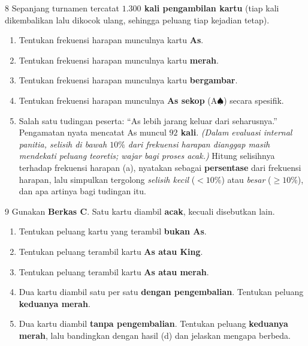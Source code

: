 \documentclass[11pt]{article}
\newenvironment{subsoal}{%
  \begin{enumerate}[label=\textbf{(\alph*)},leftmargin=1.8em,itemsep=5pt,topsep=3pt]}%
  {\end{enumerate}}
\begin{document}
\begin{soal}{8}
Sepanjang turnamen tercatat \textbf{$1.300$ kali pengambilan kartu} (tiap kali
dikembalikan lalu dikocok ulang, sehingga peluang tiap kejadian tetap).
\begin{subsoal}
  \item Tentukan frekuensi harapan munculnya kartu \textbf{As}.
  \item Tentukan frekuensi harapan munculnya kartu \textbf{merah}.
  \item Tentukan frekuensi harapan munculnya kartu \textbf{bergambar}.
  \item Tentukan frekuensi harapan munculnya \textbf{As sekop} ($\mathrm{A}\spadesuit$)
        secara spesifik.
  \item Salah satu tudingan peserta: ``As lebih jarang keluar dari seharusnya.''
        Pengamatan nyata mencatat As muncul \textbf{$92$ kali}. \emph{(Dalam evaluasi
        internal panitia, selisih di bawah $10\%$ dari frekuensi harapan dianggap
        masih mendekati peluang teoretis; wajar bagi proses acak.)} Hitung
        selisihnya terhadap frekuensi harapan (a), nyatakan sebagai \textbf{persentase}
        dari frekuensi harapan, lalu simpulkan tergolong \emph{selisih kecil}
        ($<10\%$) atau \emph{besar} ($\ge10\%$), dan apa artinya bagi tudingan itu.
\end{subsoal}
\end{soal}

\begin{soal}{9}
Gunakan \textbf{Berkas C}. Satu kartu diambil \textbf{acak}, kecuali disebutkan lain.
\begin{subsoal}
  \item Tentukan peluang kartu yang terambil \textbf{bukan As}.
  \item Tentukan peluang terambil kartu \textbf{As atau King}.
  \item Tentukan peluang terambil kartu \textbf{As atau merah}.
  \item Dua kartu diambil satu per satu \textbf{dengan pengembalian}. Tentukan
        peluang \textbf{keduanya merah}.
  \item Dua kartu diambil \textbf{tanpa pengembalian}. Tentukan peluang
        \textbf{keduanya merah}, lalu bandingkan dengan hasil (d) dan jelaskan
        mengapa berbeda.
\end{subsoal}
\end{soal}
\end{document}
